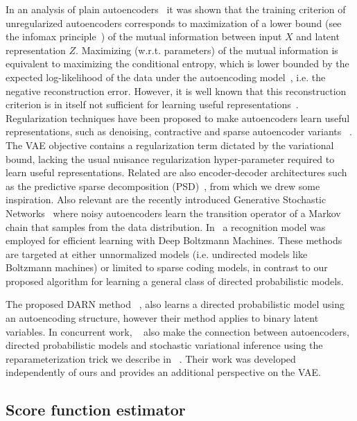 \documentclass[MAL,biber]{nowfnt} %
\begin{document}
 In an analysis of plain autoencoders~\citep{vincent2010stacked} it was shown that the training criterion of unregularized autoencoders corresponds to maximization of a lower bound (see the infomax principle~\citep{linsker1989application}) of the mutual information between input $X$ and latent representation $Z$. Maximizing (w.r.t. parameters) of the mutual information is equivalent to maximizing the conditional entropy, which is lower bounded by the expected log-likelihood of the data under the autoencoding model~\citep{vincent2010stacked}, i.e. the negative reconstruction error.
However, it is well known that this reconstruction criterion is in itself not sufficient for learning useful representations~\citep{bengio2013representation}.
Regularization techniques have been proposed to make autoencoders learn useful representations, such as  denoising, contractive and sparse autoencoder variants~ \citep{bengio2013representation}. The VAE objective contains a regularization term dictated by the variational bound, lacking the usual nuisance regularization hyper-parameter required to learn useful representations.
Related are also encoder-decoder architectures such as the predictive sparse decomposition (PSD)~\citep{koray-psd-08}, from which we drew some inspiration. Also relevant are the recently introduced Generative Stochastic Networks~\citep{bengio2014deep} where noisy autoencoders learn the transition operator of a Markov chain that samples from the data distribution. In~\citep{salakhutdinov2010efficient} a recognition model was employed for efficient learning with Deep Boltzmann Machines.
These methods are targeted at either unnormalized models (i.e. undirected models like Boltzmann machines) or limited to sparse coding models, in contrast to our proposed algorithm for learning a general class of directed probabilistic models.

 The proposed DARN method ~\citep{gregor2014deep}, also learns a directed probabilistic model using an autoencoding structure, however their method applies to binary latent variables. In concurrent work, ~\cite{rezende2014stochastic} also make the connection between autoencoders, directed probabilistic models and stochastic variational inference using the reparameterization trick we describe in ~\citep{kingma2013auto}. Their work was developed independently of ours and provides an additional perspective on the VAE.

\subsection{Score function estimator}
\label{sec:reinforce}
\end{document}
